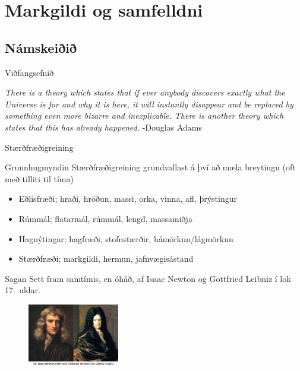 \documentclass[icelandic,a4paper,12pt]{article}
\date{29. ágúst 2012}
\begin{document}
\begin{frame}
	\maketitle
\end{frame}
\section*{Markgildi og samfelldni}
\subsection*{Námskeiðið}
\begin{frame}{Viðfangsefnið}
 \begin{block}{}
 \emph{There is a theory which states that if ever anybody discovers exactly what the Universe is for and 
  why it is here, it will instantly disappear and be replaced by something even more bizarre and inexplicable. 
  There is another theory which states that this has already happened.} \hfill -Douglas Adams
 \end{block}

\end{frame}

\begin{frame}{Stærðfræðigreining}

\begin{block}{Grunnhugmyndin}
 Stærðfræðigreining grundvallast á því að mæla breytingu (oft með tilliti til tíma)
 \begin{itemize}
  \item Eðlisfræði; hraði, hröðun, massi, orka, vinna, afl, þrýstingur
  \item Rúmmál; flatarmál, rúmmál, lengd, massamiðja
  \item Hagnýtingar; hagfræði, stofnstærðir, hámörkun/lágmörkun 
  \item Stærðfræði; markgildi, hermun, jafnvægisástand
 \end{itemize}
  \end{block}

\pause


\begin{block}{Sagan}
 Sett fram samtímis, en óháð, af Isaac Newton og Gottfried Leibniz í lok 17.~aldar.
\end{block}

\begin{figure}
 \includegraphics[width=4cm]{./myndir/kafli01/01_NewtonLeibniz.jpg}
\end{figure}



\end{frame}
\end{document}
